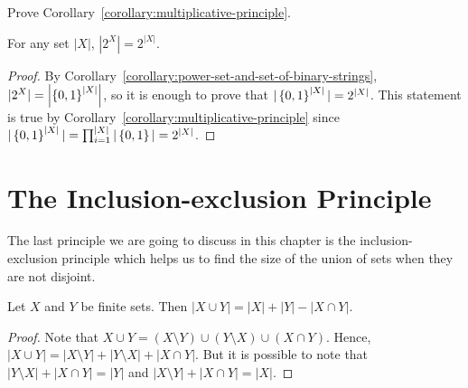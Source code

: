 \begin{exercise}
  Prove Corollary~\ref{corollary:multiplicative-principle}.
\end{exercise}

\begin{theorem}
\label{theorem:cardinality-of-power-set}
  For any set $|X|$, $|2^X| = 2^{|X|}$.
\end{theorem}
\begin{proof}
  By Corollary~\ref{corollary:power-set-and-set-of-binary-strings}, $|2^X| =
  \left|\set{0, 1}^{|X|}\right|$, so it is enough to prove that
  $|\set{0, 1}^{|X|}| = 2^{|X|}$. This statement is true by
  Corollary~\ref{corollary:multiplicative-principle} since $|\set{0, 1}^{|X|}| =
  \prod_{i = 1}^{|X|} |\set{0, 1}| = 2^{|X|}$.
\end{proof}

\section{The Inclusion-exclusion Principle}

The last principle we are going to discuss in this chapter is the
inclusion-exclusion principle which helps us to find the size of the union
of sets when they are not disjoint.
\begin{theorem}
\label{theorem:inclusion-exclusion-principle}
  Let $X$ and $Y$ be finite sets. Then $|X \cup Y| = |X| + |Y| - |X \cap Y|$.
\end{theorem}
\begin{proof}
  Note that $X \cup Y = (X \setminus Y) \cup (Y \setminus X) \cup (X \cap Y)$.
  Hence, $|X \cup Y| = |X \setminus Y| + |Y \setminus X| + |X \cap Y|$. But it
  is possible to note that $|Y \setminus X| + |X \cap Y| = |Y|$ and
  $|X \setminus Y| + |X \cap Y| = |X|$.
\end{proof}

